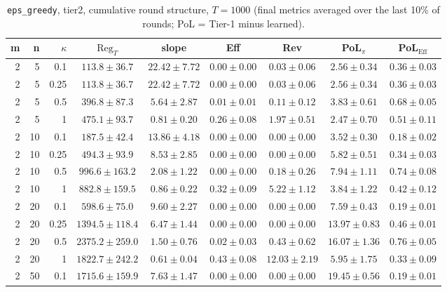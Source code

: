 \begin{table}[htbp]
\centering
\scriptsize
\caption{\texttt{eps\_greedy}, tier2, cumulative round structure, $T=1000$ (final metrics averaged over the last 10\% of rounds; PoL = Tier-1 minus learned).}
\label{tab:tier2_eps_greedy_cumulative}
\begin{tabular}{@{}rrrcccccc@{}}
\toprule
m & n & $\kappa$ & $\mathrm{Reg}_T$ & slope & Eff & Rev & PoL$_\pi$ & PoL$_\mathrm{Eff}$ \\
\midrule
2 & 5 & 0.1 & $113.8 \pm 36.7$ & $22.42 \pm 7.72$ & $0.00 \pm 0.00$ & $0.03 \pm 0.06$ & $2.56 \pm 0.34$ & $0.36 \pm 0.03$ \\
2 & 5 & 0.25 & $113.8 \pm 36.7$ & $22.42 \pm 7.72$ & $0.00 \pm 0.00$ & $0.03 \pm 0.06$ & $2.56 \pm 0.34$ & $0.36 \pm 0.03$ \\
2 & 5 & 0.5 & $396.8 \pm 87.3$ & $5.64 \pm 2.87$ & $0.01 \pm 0.01$ & $0.11 \pm 0.12$ & $3.83 \pm 0.61$ & $0.68 \pm 0.05$ \\
2 & 5 & 1 & $475.1 \pm 93.7$ & $0.81 \pm 0.20$ & $0.26 \pm 0.08$ & $1.97 \pm 0.51$ & $2.47 \pm 0.70$ & $0.51 \pm 0.11$ \\
2 & 10 & 0.1 & $187.5 \pm 42.4$ & $13.86 \pm 4.18$ & $0.00 \pm 0.00$ & $0.00 \pm 0.00$ & $3.52 \pm 0.30$ & $0.18 \pm 0.02$ \\
2 & 10 & 0.25 & $494.3 \pm 93.9$ & $8.53 \pm 2.85$ & $0.00 \pm 0.00$ & $0.00 \pm 0.00$ & $5.82 \pm 0.51$ & $0.34 \pm 0.03$ \\
2 & 10 & 0.5 & $996.6 \pm 163.2$ & $2.08 \pm 1.22$ & $0.00 \pm 0.00$ & $0.18 \pm 0.26$ & $7.94 \pm 1.11$ & $0.74 \pm 0.08$ \\
2 & 10 & 1 & $882.8 \pm 159.5$ & $0.86 \pm 0.22$ & $0.32 \pm 0.09$ & $5.22 \pm 1.12$ & $3.84 \pm 1.22$ & $0.42 \pm 0.12$ \\
2 & 20 & 0.1 & $598.6 \pm 75.0$ & $9.60 \pm 2.27$ & $0.00 \pm 0.00$ & $0.00 \pm 0.00$ & $7.59 \pm 0.43$ & $0.19 \pm 0.01$ \\
2 & 20 & 0.25 & $1394.5 \pm 118.4$ & $6.47 \pm 1.44$ & $0.00 \pm 0.00$ & $0.00 \pm 0.00$ & $13.97 \pm 0.83$ & $0.46 \pm 0.01$ \\
2 & 20 & 0.5 & $2375.2 \pm 259.0$ & $1.50 \pm 0.76$ & $0.02 \pm 0.03$ & $0.43 \pm 0.62$ & $16.07 \pm 1.36$ & $0.76 \pm 0.05$ \\
2 & 20 & 1 & $1822.7 \pm 242.2$ & $0.61 \pm 0.04$ & $0.43 \pm 0.08$ & $12.03 \pm 2.19$ & $5.95 \pm 1.75$ & $0.33 \pm 0.09$ \\
2 & 50 & 0.1 & $1715.6 \pm 159.9$ & $7.63 \pm 1.47$ & $0.00 \pm 0.00$ & $0.00 \pm 0.00$ & $19.45 \pm 0.56$ & $0.19 \pm 0.01$ \\

\end{tabular}
\end{table}
